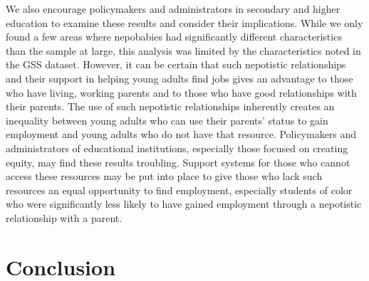 \documentclass[12pt]{article}
\begin{document}
We also encourage policymakers and administrators in secondary and higher education to examine these results and consider their implications. While we only found a few areas where nepobabies had significantly different characteristics than the sample at large, this analysis was limited by the characteristics noted in the GSS dataset. However, it can be certain that such nepotistic relationships and their support in helping young adults find jobs gives an advantage to those who have living, working parents and to those who have good relationships with their parents. The use of such nepotistic relationships inherently creates an inequality between young adults who can use their parents’ status to gain employment and young adults who do not have that resource. Policymakers and administrators of educational institutions, especially those focused on creating equity, may find these results troubling. Support systems for those who cannot access these resources may be put into place to give those who lack such resources an equal opportunity to find employment, especially students of color who were significantly less likely to have gained employment through a nepotistic relationship with a parent.


\section{Conclusion}
\label{sec:conclusion}
\end{document}
